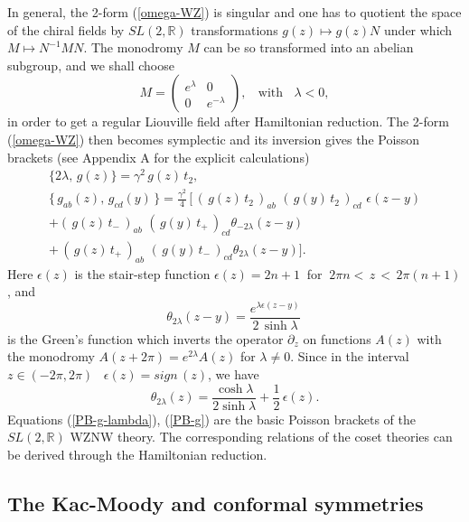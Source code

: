 \documentclass[a4paper,12pt]{article}
\newcommand{\rr}{\mathbb{R}}
\begin{document}
\noindent
In general, the 2-form (\ref{omega-WZ}) is singular and one has to
quotient the space of the chiral fields by $SL(2,\rr)$ transformations
$g(z)\mapsto g(z)N$ \cite{Goddard} under which $M\mapsto N^{-1}MN$. The
monodromy $M$ can be so transformed into an abelian subgroup, and we shall
choose
\begin{equation}\label{monodromy-g1}
  M=\left( \begin{array}{cr}
  e^{\lambda} & 0\\ 0 & e^{-\lambda} \end{array}\right),
~~~~\mbox{with}~~~~\lambda < 0,
\end{equation}
in order to get a regular Liouville field after Hamiltonian reduction.
The 2-form (\ref{omega-WZ}) then becomes symplectic and its inversion
gives the Poisson brackets (see Appendix A for the explicit
calculations)
\begin{eqnarray}\label{PB-g-lambda}
\{2\lambda ,\,g(z)\} = \gamma^2 \,g(z)\,t_2,\\
\label{PB-g}
\{\,g_{ab}(z),\, g_{cd}(y)\,\}=
\frac{\gamma^2}{4}\,[\,(\,g(z)\,t_2\,)_{ab}\,\,
(\,g(y)\,t_2\,)_{cd}\,\,\epsilon(z-y) \nonumber\\
+(\,g(z)\,t_-\,)_{ab}\,\,
(\,g(y)\,t_+\,)_{cd}
\theta_{-2\lambda} (z-y)\nonumber\\
+\, (\,g(z)\,t_+\,)_{ab}\,\,
(\,g(y)\,t_-\,)_{cd}
\theta_{2\lambda} (z-y)].
\end{eqnarray}
Here $\epsilon (z)$ is the stair-step function $\epsilon (z)= 2n+1~$
for $~2\pi n <\,z\,<\, 2\pi (n+1)$, and
\begin{equation}\label{theta_lambda}
\theta_{2\lambda} (z-y)=\frac{e^{\lambda \epsilon(z-y)}}{2\,\sinh\lambda}\,
\end{equation}
is the Green's function \cite{Thorn} which
inverts  the operator $\partial_z$ on
functions $A(z)$ with the monodromy $A(z+2\pi)=e^{2\lambda}A(z)$
for $\lambda\neq 0$.
Since in the interval $z\in(-2\pi, 2\pi)$ \, $\epsilon(z)=sign\,(z)$,
we have
\begin{equation}\label{theta_lambda1}
\theta_{2\lambda} (z)=\frac{\cosh\lambda}{2\sinh\lambda}+
\frac{1}{2}\,\epsilon (z).
\end{equation}
Equations (\ref{PB-g-lambda}), (\ref{PB-g}) are the basic Poisson
brackets of the $SL(2,\rr)$ WZNW theory.
The corresponding relations of the coset theories can be derived
through the Hamiltonian reduction.


\subsection{The Kac-Moody and conformal symmetries}
\end{document}
